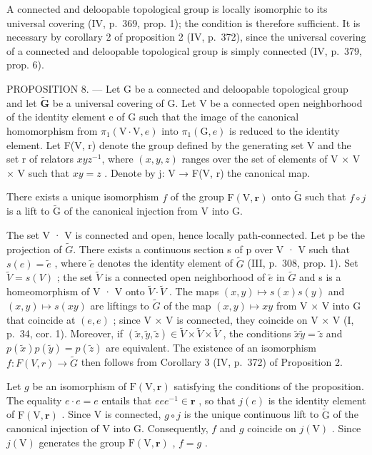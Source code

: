 A connected and deloopable topological group is locally isomorphic to its universal covering (IV, p.~369, prop. 1); the condition is therefore sufficient. It is necessary by corollary 2 of proposition 2 (IV, p.~372), since the universal covering of a connected and deloopable topological group is simply connected (IV, p.~379, prop. 6).

PROPOSITION 8. --- Let G be a connected and deloopable topological group and let \(\widetilde{\mathbf{G}}\) be a universal covering of G. Let V be a connected open neighborhood of the identity element e of G such that the image of the canonical homomorphism from \(\pi_1(\mathrm{V} \cdot \mathrm{V}, e)\) into \(\pi_1(\mathrm{G}, e)\) is reduced to the identity element. Let F(V, r) denote the group defined by the generating set V and the set r of relators \(xyz^{-1}\), where \((x, y, z)\) ranges over the set of elements of V × V × V such that \(xy = z\) . Denote by j: V → F(V, r) the canonical map.

There exists a unique isomorphism \(f\) of the group \(\mathrm{F}(\mathrm{V},\mathbf{r})\) onto \(\widetilde{\mathrm{G}}\) such that \(f \circ j\) is a lift to \(\widetilde{\mathrm{G}}\) of the canonical injection from V into G.

The set V · V is connected and open, hence locally path-connected. Let p be the projection of \(\widetilde{G}\). There exists a continuous section s of p over V · V such that \(s(e) = \widetilde{e}\) , where \(\widetilde{e}\) denotes the identity element of \(\widetilde{G}\) (III, p.~308, prop. 1). Set \(\widetilde{V} = s(V)\) ; the set \(\widetilde{V}\) is a connected open neighborhood of \(\widetilde{e}\) in \(\widetilde{G}\) and s is a homeomorphism of V · V onto \(\widetilde{V} \cdot \widetilde{V}\) . The maps \((x, y) \mapsto s(x)s(y)\) and \((x, y) \mapsto s(xy)\) are liftings to \(\widetilde{G}\) of the map \((x, y) \mapsto xy\) from V × V into G that coincide at \((e, e)\) ; since V × V is connected, they coincide on V × V (I, p.~34, cor. 1). Moreover, if \((\widetilde{x}, \widetilde{y}, \widetilde{z}) \in \widetilde{V} \times \widetilde{V} \times \widetilde{V}\) , the conditions \(\widetilde{x}\widetilde{y} = \widetilde{z}\) and \(p(\widetilde{x})p(\widetilde{y}) = p(\widetilde{z})\) are equivalent. The existence of an isomorphism \(f: F(V, r) \to \widetilde{G}\) then follows from Corollary 3 (IV, p.~372) of Proposition 2.

Let \(g\) be an isomorphism of \(\mathrm{F}(\mathrm{V},\mathbf{r})\) satisfying the conditions of the proposition. The equality \(e \cdot e = e\) entails that \(eee^{-1} \in \mathbf{r}\) , so that \(j(e)\) is the identity element of \(\mathrm{F}(\mathrm{V},\mathbf{r})\) . Since V is connected, \(g \circ j\) is the unique continuous lift to \(\widetilde{\mathrm{G}}\) of the canonical injection of V into G. Consequently, \(f\) and \(g\) coincide on \(j(\mathrm{V})\) . Since \(j(\mathrm{V})\) generates the group \(\mathrm{F}(\mathrm{V},\mathbf{r})\) , \(f = g\) .

